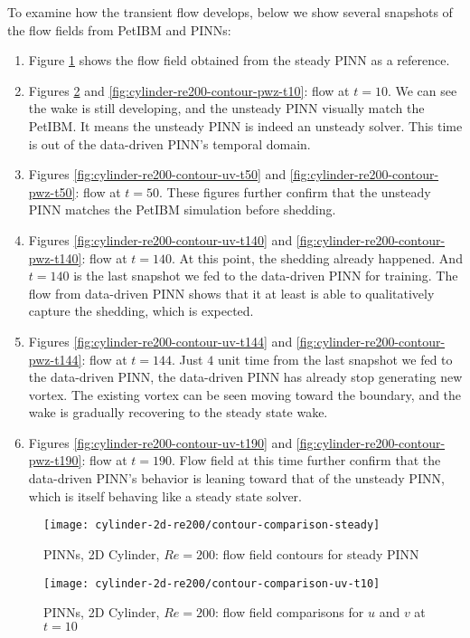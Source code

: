 To examine how the transient flow develops, below we show several snapshots of the flow fields from PetIBM and PINNs:
\begin{enumerate}
    \item Figure \ref{fig:cylinder-re200-contour-steady} shows the flow field obtained from the steady PINN as a reference.
    \item Figures \ref{fig:cylinder-re200-contour-uv-t10} and \ref{fig:cylinder-re200-contour-pwz-t10}: flow at $t=10$. We can see the wake is still developing, and the unsteady PINN visually match the PetIBM. It means the unsteady PINN is indeed an unsteady solver. This time is out of the data-driven PINN's temporal domain.
    \item Figures \ref{fig:cylinder-re200-contour-uv-t50} and \ref{fig:cylinder-re200-contour-pwz-t50}: flow at $t=50$. These figures further confirm that the unsteady PINN matches the PetIBM simulation before shedding.
    \item Figures \ref{fig:cylinder-re200-contour-uv-t140} and \ref{fig:cylinder-re200-contour-pwz-t140}: flow at $t=140$. At this point, the shedding already happened. And $t=140$ is the last snapshot we fed to the data-driven PINN for training. The flow from data-driven PINN shows that it at least is able to qualitatively capture the shedding, which is expected.
    \item Figures \ref{fig:cylinder-re200-contour-uv-t144} and \ref{fig:cylinder-re200-contour-pwz-t144}: flow at $t=144$. Just $4$ unit time from the last snapshot we fed to the data-driven PINN, the data-driven PINN has already stop generating new vortex. The existing vortex can be seen moving toward the boundary, and the wake is gradually recovering to the steady state wake.
    \item Figures \ref{fig:cylinder-re200-contour-uv-t190} and \ref{fig:cylinder-re200-contour-pwz-t190}: flow at $t=190$. Flow field at this time further confirm that the data-driven PINN's behavior is leaning toward that of the unsteady PINN, which is itself behaving like a steady state solver.
\end{enumerate}

\begin{figure}[hbt!]
    \texttt{[image: cylinder-2d-re200/contour-comparison-steady]}
    \caption{PINNs, 2D Cylinder, $Re=200$: flow field contours for steady PINN}
    \label{fig:cylinder-re200-contour-steady}
\end{figure}

\begin{figure}[hbt!]
    \texttt{[image: cylinder-2d-re200/contour-comparison-uv-t10]}
    \caption{PINNs, 2D Cylinder, $Re=200$: flow field comparisons for $u$ and $v$ at $t=10$}
    \label{fig:cylinder-re200-contour-uv-t10}
\end{figure}


